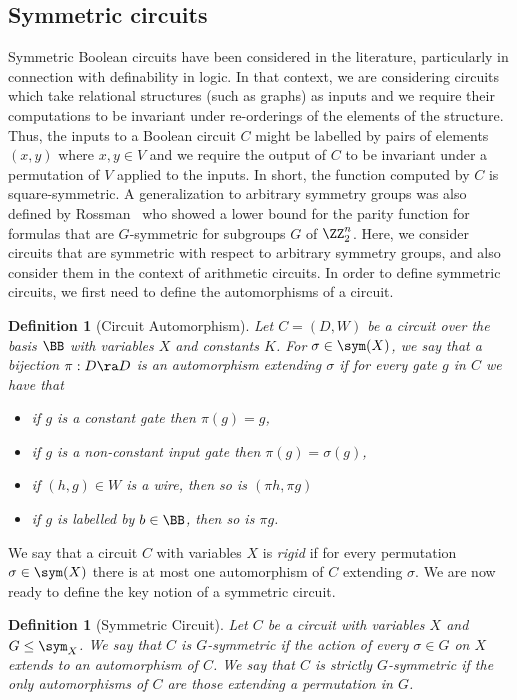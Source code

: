 \documentclass[11pt]{article}
\newtheorem{definition}[theorem]{Definition}
\begin{document}
\subsection{Symmetric circuits}
Symmetric Boolean circuits have been considered in the literature, particularly
in connection with definability in logic. In that context, we are considering
circuits which take relational structures (such as graphs) as inputs and we
require their computations to be invariant under re-orderings of the elements of
the structure.  Thus, the inputs to a Boolean circuit $C$ might be labelled by pairs of elements $(x,y)$ where $x,y \in V$ and we require the output of $C$ to be invariant under a permutation of $V$ applied to the inputs.  In short, the function computed by $C$ is square-symmetric.  A generalization to arbitrary symmetry groups was also defined by Rossman~\cite{Rossman19} who showed a lower bound for the parity function for formulas that are $G$-symmetric for subgroups $G$ of $\ZZ_2^n$.
Here, we consider circuits that are symmetric with respect to arbitrary symmetry groups, and also consider them in the context of arithmetic circuits. In order to define
symmetric circuits, we first need to define the automorphisms of a circuit.
\begin{definition}[Circuit Automorphism]
  Let $C = (D, W)$ be a circuit over the basis $\BB$ with variables $X$ and
  constants $K$. For $\sigma \in \sym(X)$, we say that a bijection $\pi : D \ra
  D$ is an \emph{automorphism} extending $\sigma$ if for every gate $g$ in $C$
  we have that
  \begin{itemize}
  \item if $g$ is a constant gate then $\pi (g) = g$,
  \item if $g$ is a non-constant input gate then $\pi (g) = \sigma (g)$,
  \item if $(h,g) \in W$ is a wire, then so is $(\pi h, \pi g)$
  \item if $g$ is labelled by $b \in \BB$, then so is $\pi g$.
  \end{itemize}
\end{definition}
We say that a circuit $C$ with variables $X$ is \emph{rigid} if for every
permutation $\sigma \in \sym(X)$ there is at most one automorphism of $C$
extending $\sigma$.
We are now ready to define the key notion of a symmetric circuit.
\begin{definition}[Symmetric Circuit]
  Let $C$ be a circuit with variables $X$ and $G \leq \sym_X$. We say that
  $C$ is
  \emph{$G$-symmetric} if the action of every $\sigma \in G$ on $X$ extends to
  an automorphism of $C$. We say that $C$ is \emph{strictly $G$-symmetric} if the only automorphisms of $C$ are those extending a permutation in $G$.
\end{definition}
\end{document}
